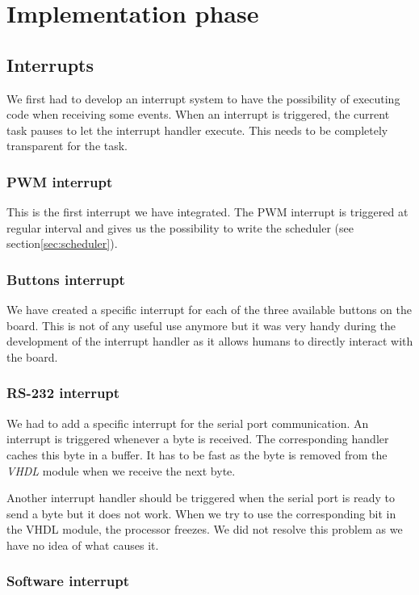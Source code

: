 \documentclass[openany, a4paper]{book}
\begin{document}
  \chapter{Implementation phase}
    \section{Interrupts}
      We first had to develop an interrupt system to have the possibility of
      executing code when receiving some events. When an interrupt is triggered,
      the current task pauses to let the interrupt handler execute. This needs
      to be completely transparent for the task.

      \subsection{PWM interrupt}
        This is the first interrupt we have integrated. The PWM interrupt is
        triggered at regular interval and gives us the possibility to write the
        scheduler (see section\ref{sec:scheduler}).

      \subsection{Buttons interrupt}
        We have created a specific interrupt for each of the three available
        buttons on the board. This is not of any useful use anymore but it was
        very handy during the development of the interrupt handler as it allows
        humans to directly interact with the board.

      \subsection{RS-232 interrupt}
        We had to add a specific interrupt for the serial port communication.
        An interrupt is triggered whenever a byte is received. The corresponding
        handler caches this byte in a buffer. It has to be fast as the byte
        is removed from the \emph{VHDL} module when we receive the next byte.

        Another interrupt handler should be triggered when the serial port is
        ready to send a byte but it does not work. When we try to use the
        corresponding bit in the VHDL module, the processor freezes. We did not
        resolve this problem as we have no idea of what causes it.

      \subsection{Software interrupt}
\end{document}
